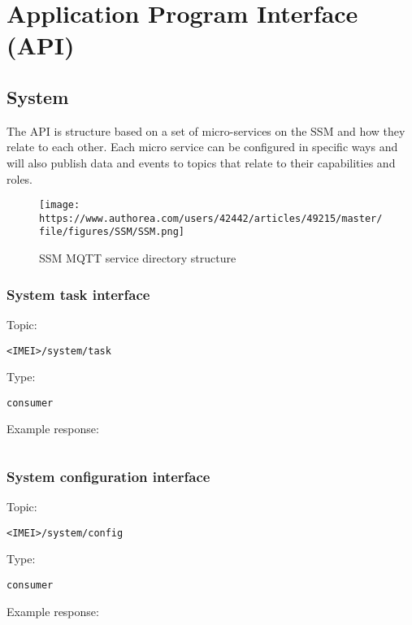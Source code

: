 \section{Application Program Interface (API)}
\subsection{System}
The API is structure based on a set of micro-services on the SSM and how they relate to each other. Each micro service can be configured in specific ways and will also publish data and events to topics that relate to their capabilities and roles.
\begin{figure}[h]
\texttt{[image: https://www.authorea.com/users/42442/articles/49215/master/file/figures/SSM/SSM.png]}
\caption{SSM MQTT service directory structure}
\centering
\end{figure}
\subsubsection{System task interface}

Topic:
\begin{lstlisting}<IMEI>/system/task\end{lstlisting}
Type:
\begin{lstlisting}consumer\end{lstlisting}
Example response:
\begin{lstlisting}\end{lstlisting}

\subsubsection{System configuration interface}

Topic:
\begin{lstlisting}<IMEI>/system/config\end{lstlisting}
Type:
\begin{lstlisting}consumer\end{lstlisting}
Example response:
\begin{lstlisting}\end{lstlisting}

